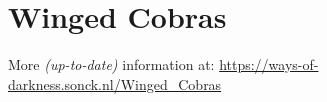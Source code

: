 \section{Winged Cobras}
More \textit{(up-to-date)} information at: \url{https://ways-of-darkness.sonck.nl/Winged_Cobras}\newline
